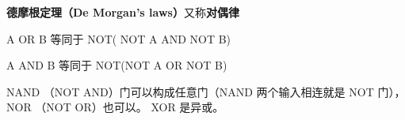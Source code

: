 
\begin{issues}
\issueDraft
\end{issues}


\textbf{德摩根定理（De Morgan's laws）}又称\textbf{对偶律}

A OR B 等同于 NOT( NOT A AND NOT B)

A AND B 等同于 NOT(NOT A OR NOT B)

NAND （NOT AND）门可以构成任意门（NAND 两个输入相连就是 NOT 门）， NOR （NOT OR）也可以。 XOR 是异或。